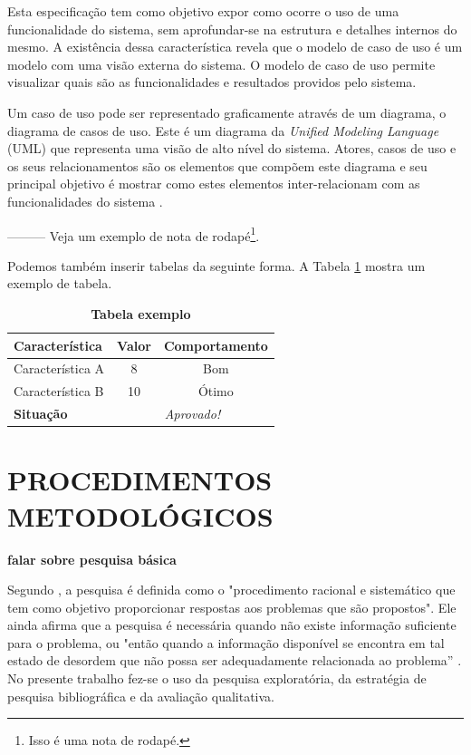 \documentclass[
	12pt,				%
	openright,			%
	oneside,			%
	a4paper,			%
	chapter=TITLE,		%
	section=TITLE,		%
	english,			%
	french,				%
	spanish,			%
	brazil				%
	]{abntex2}
\begin{document}
Esta especificação tem como objetivo expor como ocorre o uso de uma funcionalidade do sistema, sem aprofundar-se na estrutura e detalhes internos do mesmo. A existência dessa característica revela que o modelo de caso de uso é um modelo com uma visão externa do sistema. O modelo de caso de uso permite visualizar quais são as funcionalidades e resultados providos pelo sistema.

Um caso de uso pode ser representado graficamente através de um diagrama, o diagrama de casos de uso. Este é um diagrama da \textit{Unified Modeling Language} (UML) que representa uma visão de alto nível do sistema. Atores, casos de uso e os seus relacionamentos são os elementos que compõem este diagrama e seu principal objetivo é mostrar como estes elementos inter-relacionam com as funcionalidades do sistema \cite{bezerraUML}. 
 



---------
Veja um exemplo de nota de rodapé\footnote{Isso é uma nota de rodapé.}.

Podemos também inserir tabelas da seguinte forma. A Tabela \ref{tab-exemplo} mostra um exemplo de tabela.

\begin{table}[h!]
\center\scriptsize
\caption{\textbf{Tabela exemplo}}
\begin{tabular}{|l|c|c|} \hline \label{tab-exemplo}
\textbf{ Característica}	& \textbf{Valor} 	& \textbf{ Comportamento} \\ \hline
Característica A 		& 8			& Bom \\ \hline
Característica B		& 10			&Ótimo \\ \hline
\textbf{Situação}		& \multicolumn{2}{c|}{\textit{Aprovado!}} \\ \hline
\end{tabular}
\end{table}


\chapter{PROCEDIMENTOS METODOLÓGICOS}
\textbf{falar sobre pesquisa básica}


Segundo , a pesquisa é definida como o "procedimento racional e sistemático que tem como objetivo proporcionar respostas aos problemas que são propostos". Ele ainda afirma que a pesquisa é necessária quando não existe informação suficiente para o problema, ou "então quando a informação disponível se encontra em tal estado de desordem que não possa ser adequadamente relacionada ao problema” \cite[p. 1]{gilPesquisa}. No presente trabalho fez-se o uso da pesquisa exploratória, da estratégia de pesquisa bibliográfica e da avaliação qualitativa.
\end{document}
